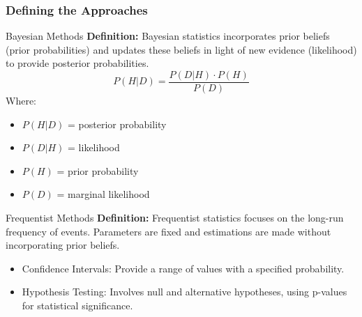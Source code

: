 \documentclass[aspectratio=169]{beamer}
\begin{document}
\begin{frame}[fragile]
    \frametitle{Defining the Approaches}

    \begin{block}{Bayesian Methods}
        \textbf{Definition:} Bayesian statistics incorporates prior beliefs (prior probabilities) and updates these beliefs in light of new evidence (likelihood) to provide posterior probabilities.
        \begin{equation}
            P(H|D) = \frac{P(D|H) \cdot P(H)}{P(D)}
        \end{equation}
        Where:
        \begin{itemize}
            \item \( P(H|D) \) = posterior probability
            \item \( P(D|H) \) = likelihood
            \item \( P(H) \) = prior probability
            \item \( P(D) \) = marginal likelihood
        \end{itemize}
    \end{block}

    \begin{block}{Frequentist Methods}
        \textbf{Definition:} Frequentist statistics focuses on the long-run frequency of events. Parameters are fixed and estimations are made without incorporating prior beliefs.
        \begin{itemize}
            \item Confidence Intervals: Provide a range of values with a specified probability.
            \item Hypothesis Testing: Involves null and alternative hypotheses, using p-values for statistical significance.
        \end{itemize}
    \end{block}
\end{frame}
\end{document}
